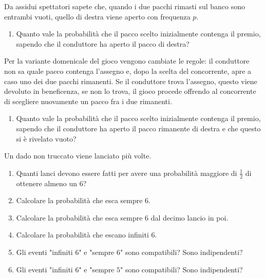 Da assidui spettatori sapete che, quando i due pacchi rimasti sul banco sono entrambi vuoti, quello di destra viene aperto con frequenza $p$.
\begin{enumerate}
\item Quanto vale la probabilità che il pacco scelto inizialmente contenga il premio, sapendo che il conduttore ha aperto il pacco di destra?
\end{enumerate}

Per la variante domenicale del gioco vengono cambiate le regole: il conduttore non sa quale pacco contenga l'assegno e, dopo la scelta del concorrente, apre a caso uno dei due pacchi rimanenti. Se il conduttore trova l'assegno, questo viene devoluto in beneficenza, se non lo trova, il gioco procede offrendo al concorrente di scegliere nuovamente un pacco fra i due rimanenti.
\begin{enumerate}
\item Quanto vale la probabilità che il pacco scelto inizialmente contenga il premio, sapendo che il conduttore ha aperto il pacco rimanente di destra e che questo si è rivelato vuoto?
\end{enumerate}

Un dado non truccato viene lanciato più volte.
\begin{enumerate}
\item Quanti lanci devono essere fatti per avere una probabilità maggiore di $\frac{1}{2}$ di ottenere almeno un $6$?
\item Calcolare la probabilità che esca sempre $6$.
\item Calcolare la probabilità che esca sempre $6$ dal decimo lancio in poi.
\item Calcolare la probabilità che escano infiniti $6$.
\item Gli eventi "infiniti $6$" e "sempre $6$" sono compatibili? Sono indipendenti?
\item Gli eventi "infiniti $6$" e "sempre $5$" sono compatibili? Sono indipendenti?
\end{enumerate}

